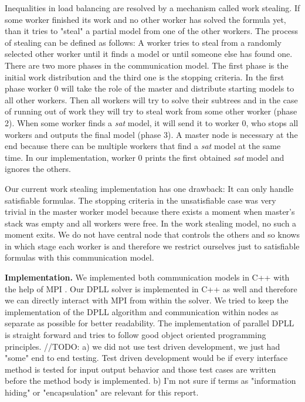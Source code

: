 \documentclass[letterpaper]{article}
\newcommand{\mypar}[1]{{\bf #1.}}
\begin{document}
Inequalities in load balancing are resolved by a mechanism called work stealing.
If some worker finished its work and no other worker has solved the formula yet, than it tries to "steal" a partial model from one of the other workers.
The process of stealing can be defined as follows:
A worker tries to steal from a randomly selected other worker until it finds a model or until someone else has found one.
There are two more phases in the communication model.
The first phase is the initial work distribution and the third one is the stopping criteria.
In the first phase worker 0 will take the role of the master and distribute starting models to all other workers.
Then all workers will try to solve their subtrees and in the case of running out of work they will try to steal work from some other worker (phase 2).
When some worker finds a \textit{sat} model, it will send it to worker 0, who stops all workers and outputs the final model (phase 3).
A master node is necessary at the end because there can be multiple workers that find a \textit{sat} model at the same time.
In our implementation, worker 0 prints the first obtained \textit{sat} model and ignores the others.

Our current work stealing implementation has one drawback:
It can only handle satisfiable formulas.
The stopping criteria in the unsatisfiable case was very trivial in the master worker model because there exists a moment when master's stack was empty and all workers were free.
In the work stealing model, no such a moment exits.
We do not have central node that controls the others and so knows in which stage each worker is and therefore we restrict ourselves just to satisfiable formulas with this communication model.

\mypar{Implementation}
We implemented both communication models in C++ with the help of MPI \cite{mpi}.
Our DPLL solver is implemented in C++ as well and therefore we can directly interact with MPI from within the solver.
We tried to keep the implementation of the DPLL algorithm and communication within nodes as separate as possible for better readability.
The implementation of parallel DPLL is straight forward and tries to follow good object oriented programming principles.
\iffalse
//TODO:
a) we did not use test driven development, we just had "some" end to end testing.
Test driven development would be if every interface method is tested for input output behavior and those test cases are written before the method body is implemented.
b) I'm not sure if terms as "information hiding" or "encapsulation" are relevant for this report.
\end{document}
